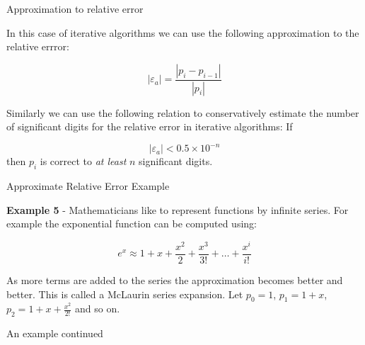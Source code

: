 \documentclass[12pt]{beamer}
\begin{document}
\begin{frame}{Approximation to relative error} 

In this case of iterative algorithms we can use the following
approximation to the relative errror: 

\begin{equation} 
|\varepsilon_{a}| = \frac{|p_i - p_{i-1}|}{|p_{i}|} 
\end{equation} 

Similarly
we can use the following relation to conservatively estimate the number of
significant digits for the relative error in iterative algorithms: If

\begin{equation} 
|\varepsilon_{a}| < 0.5 \times 10^{-n}
\end{equation} 
then $p_i$ is correct to {\it at least} $n$ significant digits.
\end{frame} 

\begin{frame}{Approximate Relative Error Example} 

{\bf Example 5} - Mathematicians like to represent functions by infinite series. For
example the exponential function can be computed using: 

\begin{equation} 
e^{x} \approx 1 + x + \frac{x^2}{2} + \frac{x^3}{3!} + \dots + \frac{x^{i}}{i!}
\end{equation} 

\noindent 
As more terms are added to the series the approximation becomes better
and better. This is called a McLaurin series expansion. Let $p_{0}
=1$, $p_{1} = 1 + x$, $p_{2} = 1 + x + \frac{x^2}{2!}$ and so on. 

\vspace{2 in}

\end{frame} 

\begin{frame}{An example continued} 


\end{frame} 
\end{document}
